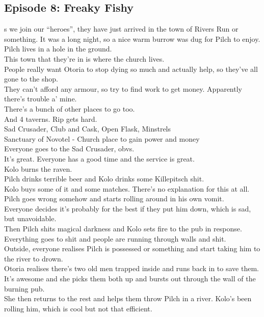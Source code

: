 \subsection{Episode 8: Freaky Fishy}
s we join our “heroes”, they have just arrived in the town of Rivers Run or something. It was a long night, so a nice warm burrow was dug for Pilch to enjoy. Pilch lives in a hole in the ground.\\
This town that they’re in is where the church lives.\\
People really want Otoria to stop dying so much and actually help, so they’ve all gone to the shop.\\
They can’t afford any armour, so try to find work to get money. Apparently there’s trouble a’ mine.\\
There’s a bunch of other places to go too.\\
And 4 taverns. Rip gets hard.\\
Sad Crusader, Club and Cask, Open Flask, Minstrels\\
Sanctuary of Novotel - Church place to gain power and money\\
Everyone goes to the Sad Crusader, obvs.\\
It’s great. Everyone has a good time and the service is great.\\
Kolo burns the raven.\\
Pilch drinks terrible beer and Kolo drinks some Killepitsch shit.\\
Kolo buys some of it and some matches. There’s no explanation for this at all.\\
Pilch goes wrong somehow and starts rolling around in his own vomit.\\
Everyone decides it’s probably for the best if they put him down, which is sad, but unavoidable.\\
Then Pilch shits magical darkness and Kolo sets fire to the pub in response.\\
Everything goes to shit and people are running through walls and shit.\\
Outside, everyone realises Pilch is possessed or something and start taking him to the river to drown.\\
Otoria realises there’s two old men trapped inside and runs back in to save them. It’s awesome and she picks them both up and bursts out through the wall of the burning pub.\\
She then returns to the rest and helps them throw Pilch in a river. Kolo’s been rolling him, which is cool but not that efficient.\\
